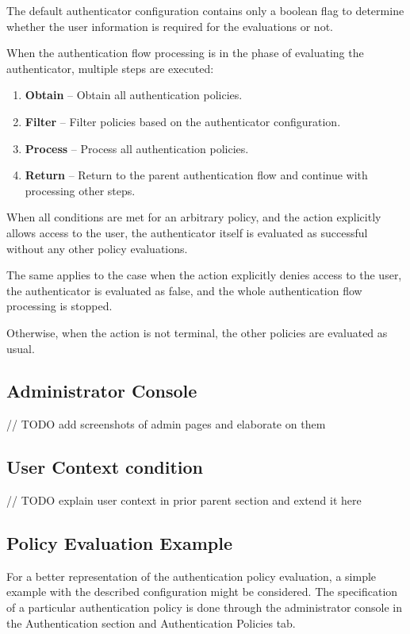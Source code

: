 The default authenticator configuration contains only a boolean flag to determine whether the user information is required for the evaluations or not.

When the authentication flow processing is in the phase of evaluating the authenticator, multiple steps are executed:

\begin{enumerate}
    \item \textbf{Obtain} -- Obtain all authentication policies.
    \item \textbf{Filter} -- Filter policies based on the authenticator configuration.
    \item \textbf{Process} -- Process all authentication policies.
    \item \textbf{Return} -- Return to the parent authentication flow and continue with processing other steps.
\end{enumerate}

When all conditions are met for an arbitrary policy, and the action explicitly allows access to the user, the authenticator itself is evaluated as successful without any other policy evaluations.

The same applies to the case when the action explicitly denies access to the user, the authenticator is evaluated as false, and the whole authentication flow processing is stopped.

Otherwise, when the action is not terminal, the other policies are evaluated as usual.

\subsection{Administrator Console}
// TODO add screenshots of admin pages and elaborate on them

\subsection{User Context condition}
// TODO explain user context in prior parent section and extend it here

\subsection{Policy Evaluation Example}
For a better representation of the authentication policy evaluation, a simple example with the described configuration might be considered.
The specification of a particular authentication policy is done through the administrator console in the Authentication section and Authentication Policies tab.

